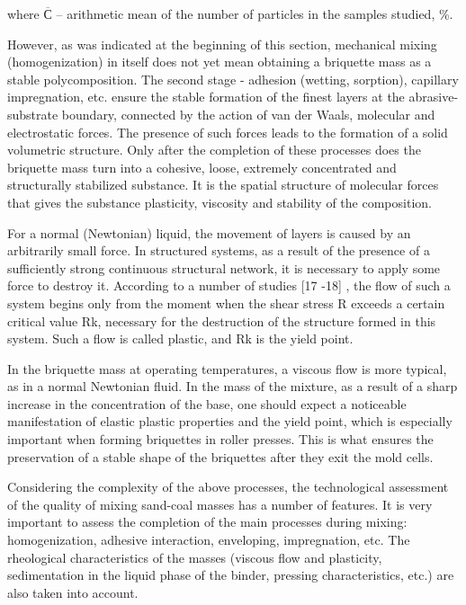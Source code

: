 \begin{multicols}{2}
where \(\overline{С}\) -- arithmetic mean of the number of particles in
the samples studied, \%.

However, as was indicated at the beginning of this section, mechanical
mixing (homogenization) in itself does not yet mean obtaining a
briquette mass as a stable polycomposition. The second stage - adhesion
(wetting, sorption), capillary impregnation, etc. ensure the stable
formation of the finest layers at the abrasive-substrate boundary,
connected by the action of van der Waals, molecular and electrostatic
forces. The presence of such forces leads to the formation of a solid
volumetric structure. Only after the completion of these processes does
the briquette mass turn into a cohesive, loose, extremely concentrated
and structurally stabilized substance. It is the spatial structure of
molecular forces that gives the substance plasticity, viscosity and
stability of the composition.

For a normal (Newtonian) liquid, the movement of layers is caused by an
arbitrarily small force. In structured systems, as a result of the
presence of a sufficiently strong continuous structural network, it is
necessary to apply some force to destroy it. According to a number of
studies {[}17 -18{]} , the flow of such a system begins only from the
moment when the shear stress R exceeds a certain critical value Rk,
necessary for the destruction of the structure formed in this system.
Such a flow is called plastic, and Rk is the yield point.

In the briquette mass at operating temperatures, a viscous flow is more
typical, as in a normal Newtonian fluid. In the mass of the mixture, as
a result of a sharp increase in the concentration of the base, one
should expect a noticeable manifestation of elastic plastic properties
and the yield point, which is especially important when forming
briquettes in roller presses. This is what ensures the preservation of a
stable shape of the briquettes after they exit the mold cells.

Considering the complexity of the above processes, the technological
assessment of the quality of mixing sand-coal masses has a number of
features. It is very important to assess the completion of the main
processes during mixing: homogenization, adhesive interaction,
enveloping, impregnation, etc. The rheological characteristics of the
masses (viscous flow and plasticity, sedimentation in the liquid phase
of the binder, pressing characteristics, etc.) are also taken into
account.


\end{multicols}
